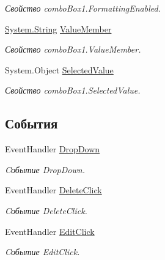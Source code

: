 \begin{DoxyCompactItemize}
\begin{DoxyCompactList}\small\item\em Свойство combo\+Box1.\+Formatting\+Enabled. \end{DoxyCompactList}\item 
\mbox{\hyperlink{namespace_f_b_a_a940b390561ecfbdb6e1606ec1711bd59a27118326006d3829667a400ad23d5d98}{System.\+String}} \mbox{\hyperlink{class_f_b_a_1_1_sys_d_b_edit_ae73b6bb746f10f54a953ee479640de81}{Value\+Member}}
\begin{DoxyCompactList}\small\item\em Свойство combo\+Box1.\+Value\+Member. \end{DoxyCompactList}\item 
System.\+Object \mbox{\hyperlink{class_f_b_a_1_1_sys_d_b_edit_a7cff77343646e851dd70f5351ece5cc4}{Selected\+Value}}
\begin{DoxyCompactList}\small\item\em Свойство combo\+Box1.\+Selected\+Value. \end{DoxyCompactList}\end{DoxyCompactItemize}
\subsection*{События}
\begin{DoxyCompactItemize}
\item 
Event\+Handler \mbox{\hyperlink{class_f_b_a_1_1_sys_d_b_edit_a2547815fbfa8bbb59c456cef2e01825b}{Drop\+Down}}
\begin{DoxyCompactList}\small\item\em Cобытие Drop\+Down. \end{DoxyCompactList}\item 
Event\+Handler \mbox{\hyperlink{class_f_b_a_1_1_sys_d_b_edit_a33013d37e1be0fc2bd617ab95bf70d3f}{Delete\+Click}}
\begin{DoxyCompactList}\small\item\em Cобытие Delete\+Click. \end{DoxyCompactList}\item 
Event\+Handler \mbox{\hyperlink{class_f_b_a_1_1_sys_d_b_edit_a0c20f52d875a08e8847539a8c5a6181e}{Edit\+Click}}
\begin{DoxyCompactList}\small\item\em Cобытие Edit\+Click. \end{DoxyCompactList}\end{DoxyCompactItemize}


